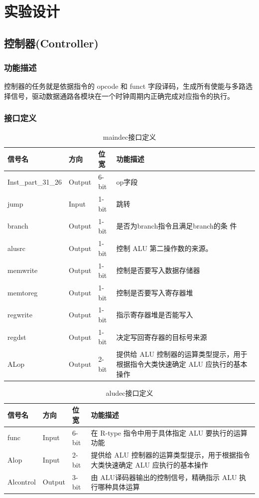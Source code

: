 \section{实验设计}
\subsection{控制器(Controller)}\label{sub:controller}
\subsubsection{功能描述}
控制器的任务就是依据指令的 opcode 和 funct 字段译码，生成所有使能与多路选择信号，驱动数据通路各模块在一个时钟周期内正确完成对应指令的执行。​​
\subsubsection{接口定义}

\begin{table}[H]
\caption{maindec接口定义}\label{tab:maindec}
\begin{center}
	\begin{tabular}{|l|l|l|p{6cm}|}
	\hline
	\textbf{信号名} & \textbf{方向} & \textbf{位宽} & \textbf{功能描述}\\ \hline \hline
	Inst\_part\_31\_26			& Output& 6-bit & op字段\\ 
	jump			& Input& 1-bit & 跳转\\ 
	branch			& Output& 1-bit & 是否为branch指令且满足branch的条
件\\ 
	alusrc			& Output& 1-bit & 控制 ALU 第二操作数的来源。\\ 
	memwrite			& Output& 1-bit & 控制是否要写入数据存储器\\ 
	memtoreg			& Output& 1-bit & 控制是否要写入寄存器堆\\ 
	regwrite			& Output& 1-bit & 指示寄存器堆是否能写入\\ 
	regdst			& Output& 1-bit & 决定写回寄存器的目标号来源\\ 
	ALop			& Output& 2-bit & 提供给 ALU 控制器的运算类型提示，用于根据指令大类快速确定 ALU 应执行的基本操作\\ 
	\hline
	\end{tabular}
\end{center}
\end{table}
\begin{table}[htp]
\caption{aludec接口定义}\label{tab:aludec}
\begin{center}
	\begin{tabular}{|l|l|l|p{6cm}|}
	\hline
	\textbf{信号名} & \textbf{方向} & \textbf{位宽} & \textbf{功能描述}\\ \hline \hline
	func			& Input& 6-bit & 在 R-type 指令中用于具体指定 ALU 要执行的运算功能\\ 
	Alop			& Input& 2-bit & 提供给 ALU 控制器的运算类型提示，用于根据指令大类快速确定 ALU 应执行的基本操作\\ 
	Alcontrol			& Output& 3-bit & 由 ALU译码器输出的控制信号，精确指示 ALU 执行哪种具体运算\\ 
	\hline
	\end{tabular}
\end{center}
\end{table}
